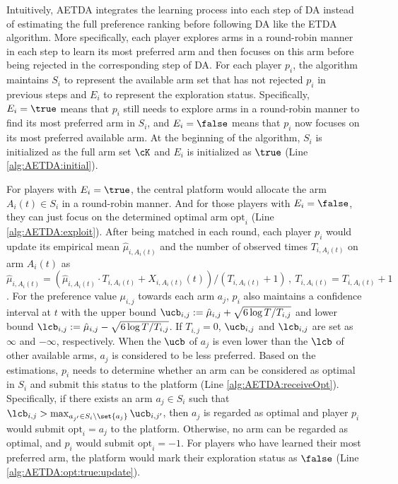 Intuitively, AETDA integrates the learning process into each step of DA instead of estimating the full preference ranking before following DA like the ETDA algorithm. More specifically, each player explores arms in a round-robin manner in each step to learn its most preferred arm and then focuses on this arm before being rejected in the corresponding step of DA. 
For each player $p_i$, the algorithm maintains $S_i$ to represent the available arm set that has not rejected $p_i$ in previous steps
and $E_i$ to represent the exploration status. Specifically, $E_i=\true$ means that $p_i$ still needs to explore arms in a round-robin manner to find its most preferred arm in $S_i$, and $E_i=\false$ means that $p_i$ now focuses on its most preferred available arm. At the beginning of the algorithm, $S_i$ is initialized as the full arm set $\cK$ and $E_i$ is initialized as $\true$ (Line \ref{alg:AETDA:initial}). 



For players with $E_i = \true$, the central platform would allocate the arm $A_i(t)\in S_i$ in a round-robin manner.
And for those players with $E_i=\false$, they can just focus on the determined optimal arm $\mathrm{opt}_i$ (Line \ref{alg:AETDA:exploit}).
After being matched in each round, each player $p_i$ would update its empirical mean $\hat{\mu}_{i,A_i(t)}$ and the number of observed times $T_{i,A_i(t)}$ on arm $A_i(t)$ as $\hat{\mu}_{i,A_i(t)} = ({\hat{\mu}_{i,A_i(t)}\cdot T_{i,A_i(t)} + X_{i,A_i(t)}(t) })/{(T_{i,A_i(t)}+1)}\,,\ T_{i,A_i(t)} = T_{i,A_i(t)}+1$. 
For the preference value $\mu_{i,j}$ towards each arm $a_j$, $p_i$ also maintains a confidence interval at $t$ with the upper bound $\ucb_{i,j}
:= \hat{\mu}_{i,j}+\sqrt{{6\log T}/{T_{i,j}}}$ 
and lower bound $\lcb_{i,j}
:=\hat{\mu}_{i,j}-\sqrt{{6\log T}/{T_{i,j}}}$.  
If $T_{i,j}=0$, $\ucb_{i,j}$ and $\lcb_{i,j}$ are set as $\infty$ and $-\infty$, respectively. 
When the $\ucb$ of $a_j$ is even lower than the $\lcb$ of other available arms, $a_j$ is considered to be less preferred. Based on the estimations, $p_i$ needs to determine whether an arm can be considered as optimal in $S_i$ and submit this status to the platform (Line \ref{alg:AETDA:receiveOpt}). Specifically, if there exists an arm $a_j \in S_i$ such that $\lcb_{i,j} > \max_{a_{j'}\in S_i\setminus \set{a_j}}\ucb_{i,j'}$, then $a_j$ is regarded as optimal and player $p_i$ would submit $\mathrm{opt}_i = a_j$ to the platform. Otherwise, no arm can be regarded as optimal, and $p_i$ would submit $\mathrm{opt}_i=-1$. 
For players who have learned their most preferred arm, the platform would mark their exploration status as $\false$ (Line \ref{alg:AETDA:opt:true:update}). 

